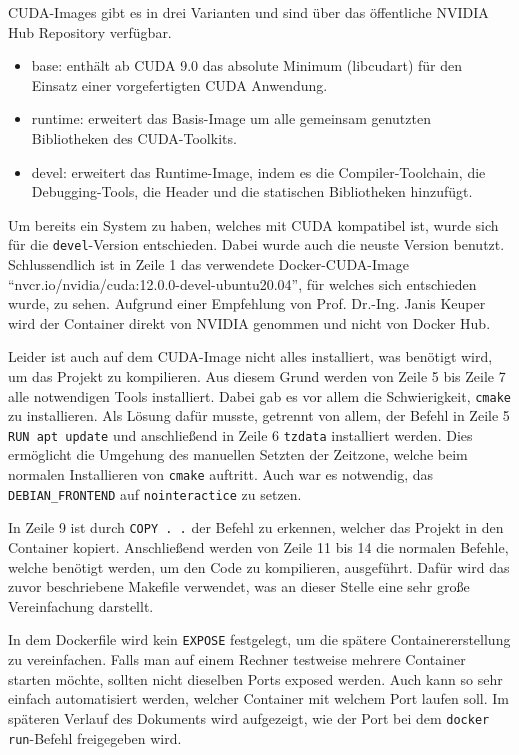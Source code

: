 CUDA-Images gibt es in drei Varianten und sind über das öffentliche NVIDIA Hub Repository verfügbar.

\begin{itemize}
    \item base: enthält ab CUDA 9.0 das absolute Minimum (libcudart) für den Einsatz einer vorgefertigten CUDA Anwendung.
    \item runtime: erweitert das Basis-Image um alle gemeinsam genutzten Bibliotheken des CUDA-Toolkits.
    \item devel: erweitert das Runtime-Image, indem es die Compiler-Toolchain, die Debugging-Tools, die Header und die statischen Bibliotheken hinzufügt.
\end{itemize}

Um bereits ein System zu haben, welches mit CUDA kompatibel ist, wurde sich für die \verb|devel|-Version entschieden. Dabei wurde auch die neuste Version benutzt. Schlussendlich ist in Zeile 1 das verwendete Docker-CUDA-Image ``nvcr.io/nvidia/cuda:12.0.0-devel-ubuntu20.04'', für welches sich entschieden wurde, zu sehen. Aufgrund einer Empfehlung von Prof. Dr.-Ing. Janis Keuper wird der Container direkt von NVIDIA genommen und nicht von Docker Hub.

Leider ist auch auf dem CUDA-Image nicht alles installiert, was benötigt wird, um das Projekt zu kompilieren. Aus diesem Grund werden von Zeile 5 bis Zeile 7 alle notwendigen Tools installiert. Dabei gab es vor allem die Schwierigkeit, \verb|cmake| zu installieren. Als Lösung dafür musste, getrennt von allem, der Befehl in Zeile 5 \verb|RUN apt update| und anschließend in Zeile 6 \verb|tzdata| installiert werden. Dies ermöglicht die Umgehung des manuellen Setzten der Zeitzone, welche beim normalen Installieren von \verb|cmake| auftritt. Auch war es notwendig, das \verb|DEBIAN_FRONTEND| auf \verb|nointeractice| zu setzen.

In Zeile 9 ist durch \verb|COPY . .| der Befehl zu erkennen, welcher das Projekt in den Container kopiert. Anschließend werden von Zeile 11 bis 14 die normalen Befehle, welche benötigt werden, um den Code zu kompilieren, ausgeführt. Dafür wird das zuvor beschriebene Makefile verwendet, was an dieser Stelle eine sehr große Vereinfachung darstellt.

In dem Dockerfile wird kein \verb|EXPOSE| festgelegt, um die spätere Containererstellung zu vereinfachen. Falls man auf einem Rechner testweise mehrere Container starten möchte, sollten nicht dieselben Ports exposed werden. Auch kann so sehr einfach automatisiert werden, welcher Container mit welchem Port laufen soll. Im späteren Verlauf des Dokuments wird aufgezeigt, wie der Port bei dem \verb|docker run|-Befehl freigegeben wird.

